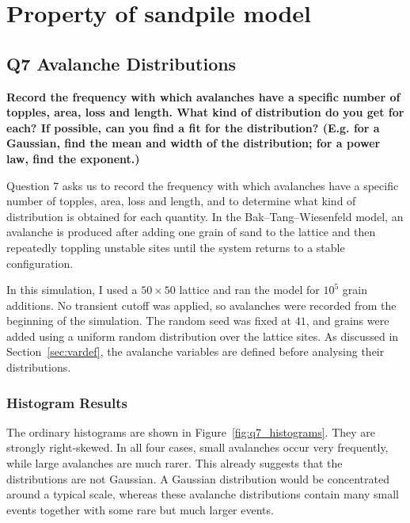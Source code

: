 \chapter{Property of sandpile model}\label{ch:introduction3}

\section{Q7 Avalanche Distributions}

\textbf{Record the frequency with which avalanches have a specific number of topples, area, loss and length. What kind of distribution do you get for each? If possible, can you find a fit for the distribution? (E.g. for a Gaussian, find the mean and width of the distribution; for a power law, find the exponent.)}

Question 7 asks us to record the frequency with which avalanches have a specific number of topples, area, loss and length, and to determine what kind of distribution is obtained for
each quantity. In the Bak--Tang--Wiesenfeld model, an avalanche is produced after adding
one grain of sand to the lattice and then repeatedly toppling unstable sites until the system
returns to a stable configuration.

In this simulation, I used a \(50 \times 50\) lattice and ran the model for \(10^5\) grain additions. No transient cutoff was applied, so avalanches were recorded from the beginning of the simulation. The random seed was fixed at \(41\), and grains were added using a uniform random distribution over the lattice sites.
As discussed in Section~\ref{sec:vardef}, the avalanche variables are defined before analysing their distributions.

\subsection{Histogram Results}

The ordinary histograms are shown in Figure~\ref{fig:q7_histograms}. They are strongly
right-skewed. In all four cases, small avalanches occur very frequently, while large avalanches
are much rarer. This already suggests that the distributions are not Gaussian. A Gaussian
distribution would be concentrated around a typical scale, whereas these avalanche
distributions contain many small events together with some rare but much larger events.

